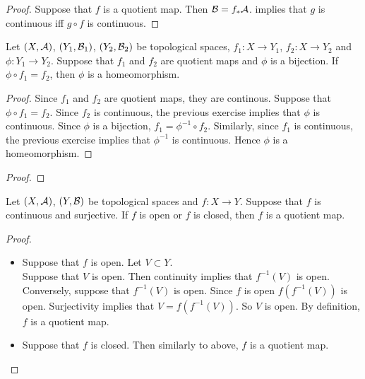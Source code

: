 \documentclass{book}
\begin{document}
	\begin{proof}
		Suppose that $f$ is a quotient map. Then $\mathcal{B} = f_* \mathcal{A}$.  implies that $g$ is continuous iff $g \circ f$ is continuous.
	\end{proof}

	\begin{ex} 
		Let $(X, \mathcal{A})$, $(Y_1, \mathcal{B}_1)$, $(Y_2, \mathcal{B}_2)$ be topological spaces, $f_1:X \rightarrow Y_1$, $f_2:X \rightarrow Y_2$ and $\phi: Y_1 \rightarrow Y_2$. Suppose that $f_1$ and $f_2$ are quotient maps and $\phi$ is a bijection. If $\phi \circ f_1 = f_2$, then $\phi$ is a homeomorphism. 
	\end{ex}
	
	\begin{proof}
		Since $f_1$ and $f_2$ are quotient maps, they are continous. Suppose that $\phi \circ f_1 = f_2$. Since $f_2$ is continuous, the previous exercise implies that $\phi$ is continuous. Since $\phi$ is a bijection, $f_1 = \phi^{-1} \circ f_2$. Similarly, since $f_1$ is continuous, the previous exercise implies that $\phi^{-1}$ is continuous. Hence $\phi$ is a homeomorphism.
	\end{proof}

	\begin{ex} 
	\end{ex}

	\begin{proof}
	\end{proof}
	
	\begin{ex} 
	Let $(X, \mathcal{A})$, $(Y, \mathcal{B})$ be topological spaces and $f:X \rightarrow Y$. Suppose that $f$ is continuous and surjective. If $f$ is open or $f$ is closed, then $f$ is a quotient map. 
	\end{ex}
	
	\begin{proof}\
	\begin{itemize}	
	\item Suppose that $f$ is open. Let $V \subset Y$. \\
	Suppose that $V$ is open. Then continuity implies that $f^{-1}(V)$ is open. Conversely, suppose that $f^{-1}(V)$ is open. Since $f$ is open $f(f^{-1}(V))$ is open. Surjectivity implies that $V = f(f^{-1}(V))$. So $V$ is open. By definition, $f$ is a quotient map.\\
	\item   
	Suppose that $f$ is closed. Then similarly to above, $f$ is a quotient map.
	\end{itemize}
	\end{proof}
	
\end{document}
